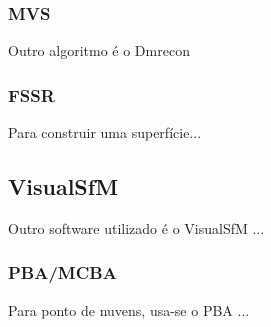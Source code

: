 \documentclass[table, usenames, svgnames, xcolor=dvipsnames]{beamer}
\begin{document}
\subsubsection{MVS}

\begin{frame} 
	\begin{center}
Outro algoritmo é o Dmrecon
	\end{center}
\end{frame}

\subsubsection{FSSR}

\begin{frame} 
	\begin{center}
Para construir uma superfície...
	\end{center}
\end{frame}


\subsection{VisualSfM}

\begin{frame} 
	\begin{center}
Outro software utilizado é o VisualSfM ...
	\end{center}
\end{frame}

\subsubsection{PBA/MCBA}

\begin{frame} 
	\begin{center}
Para ponto de nuvens, usa-se o PBA ...
	\end{center}
\end{frame}
\end{document}
